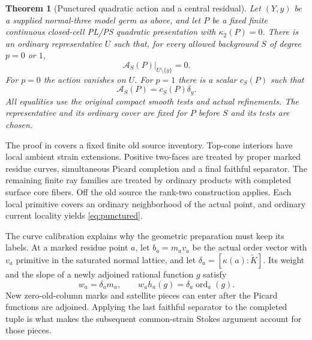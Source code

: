 \documentclass[11pt,a4paper]{article}
\newcommand{\MathEqref}[1]{{\hypersetup{linkcolor=EquationLink}\eqref{#1}}}
\newtheorem{theorem}{Theorem}[section]
\theoremstyle{definition}
\theoremstyle{remark}
\numberwithin{equation}{section}
\newcommand{\A}{\mathcal A}
\begin{document}
\begin{theorem}[Punctured quadratic action and a central residual]
\label{thm:punctured}
Let $(Y,y)$ be a supplied normal-three model germ as above, and let
$P$ be a fixed finite continuous closed-cell PL/PS quadratic
presentation with $\kappa_2(P)=0$.  There is an ordinary representative
$U$ such that, for every allowed background $S$ of degree $p=0$ or $1$,
\begin{equation}
                        \A_S(P)|_{U\setminus\{y\}}=0.
                         \label{eq:punctured}
\end{equation}
For $p=0$ the action vanishes on $U$.  For $p=1$ there is a scalar
$c_S(P)$ such that
\begin{equation}
                              \A_S(P)=c_S(P)\delta_y.
                         \label{eq:central-residual}
\end{equation}
All equalities use the original compact smooth tests and actual
refinements.  The representative and its ordinary cover are fixed for
$P$ before $S$ and its tests are chosen.
\end{theorem}

The proof in \cite{I13} covers a fixed finite old source inventory.
Top-cone interiors have local ambient strain extensions.  Positive
two-faces are treated by proper marked residue curves, simultaneous
Picard completion and a final faithful separator.  The remaining
finite ray families are treated by ordinary products with completed
surface core fibers.  Off the old source the rank-two construction
applies.  Each local primitive covers an ordinary neighborhood of the
actual point, and ordinary current locality yields
\MathEqref{eq:punctured}.

The curve calibration explains why the geometric preparation must keep
its labels.  At a marked residue point $a$, let $b_a=m_av_a$ be the
actual order vector with $v_a$ primitive in the saturated normal
lattice, and let $\delta_a=[\kappa(a):\widetilde K]$.  Its weight and
the slope of a newly adjoined rational function $g$ satisfy
\begin{equation}
                 w_a=\delta_am_a,\qquad
                 w_ah_a(g)=\delta_a\operatorname{ord}_a(g).
                         \label{eq:curve-calibration}
\end{equation}
New zero-old-column marks and satellite pieces can enter after the
Picard functions are adjoined.  Applying the last faithful separator
to the completed tuple is what makes the subsequent common-strain
Stokes argument account for those pieces.
\end{document}
